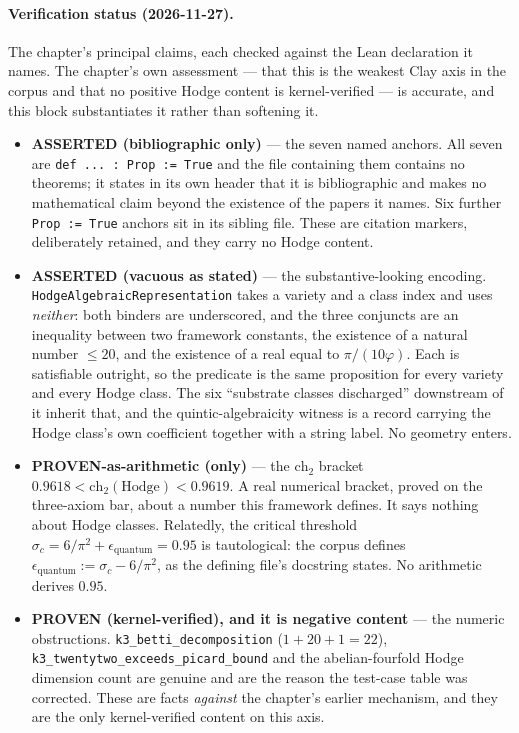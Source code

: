 \paragraph{Verification status (2026-11-27).}
The chapter's principal claims, each checked against the Lean declaration it
names. The chapter's own assessment --- that this is the weakest Clay axis in
the corpus and that no positive Hodge content is kernel-verified --- is
accurate, and this block substantiates it rather than softening it.
\begin{itemize}

\item \textbf{ASSERTED (bibliographic only)} --- the seven named anchors.
All seven are \texttt{def ... : Prop := True} and the file containing them
contains no theorems; it states in its own header that it is bibliographic and
makes no mathematical claim beyond the existence of the papers it names. Six
further \texttt{Prop := True} anchors sit in its sibling file. These are
citation markers, deliberately retained, and they carry no Hodge content.

\item \textbf{ASSERTED (vacuous as stated)} --- the substantive-looking
encoding. \texttt{HodgeAlgebraicRepresentation} takes a variety and a class
index and uses \emph{neither}: both binders are underscored, and the three
conjuncts are an inequality between two framework constants, the existence of a
natural number $\le 20$, and the existence of a real equal to
$\pi/(10\varphi)$. Each is satisfiable outright, so the predicate is the same
proposition for every variety and every Hodge class. The six
``substrate classes discharged'' downstream of it inherit that, and the
quintic-algebraicity witness is a record carrying the Hodge class's own
coefficient together with a string label. No geometry enters.

\item \textbf{PROVEN-as-arithmetic (only)} --- the $\mathrm{ch}_2$ bracket
$0.9618 < \mathrm{ch}_2(\mathrm{Hodge}) < 0.9619$. A real numerical bracket,
proved on the three-axiom bar, about a number this framework defines. It says
nothing about Hodge classes. Relatedly, the critical threshold
$\sigma_c = 6/\pi^2 + \epsilon_{\text{quantum}} = 0.95$ is tautological: the
corpus defines $\epsilon_{\text{quantum}} := \sigma_c - 6/\pi^2$, as the
defining file's docstring states. No arithmetic derives $0.95$.

\item \textbf{PROVEN (kernel-verified), and it is negative content} --- the
numeric obstructions. \texttt{k3\_betti\_decomposition} ($1 + 20 + 1 = 22$),
\texttt{k3\_twentytwo\_exceeds\_picard\_bound} and the abelian-fourfold Hodge
dimension count are genuine and are the reason the test-case table was
corrected. These are facts \emph{against} the chapter's earlier mechanism, and
they are the only kernel-verified content on this axis.


\end{itemize}

